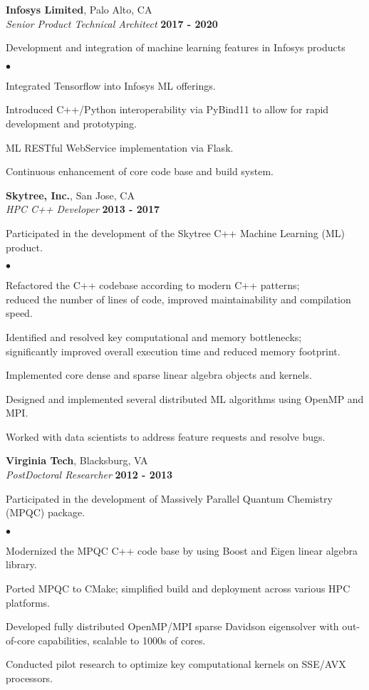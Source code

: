 \documentclass[overlap,line]{cv}
\newenvironment{list2}{
  \begin{list}{$\bullet$}{%
      \setlength{\itemsep}{0in}
      \setlength{\parsep}{0in} \setlength{\parskip}{0in}
      \setlength{\topsep}{0in} \setlength{\partopsep}{0in} 
      \setlength{\leftmargin}{0.2in}}}{\end{list}}
\begin{document}
\begin{resume}
\newpage

{\bf Infosys Limited}, Palo Alto, CA \\
{\it Senior Product Technical Architect} \hfill {\bf 2017 - 2020}

Development and integration of machine learning features in Infosys products
\vspace{.05in}
\begin{list2}
\item Integrated Tensorflow into Infosys ML offerings.
\item Introduced C++/Python interoperability via PyBind11 to allow for rapid development and prototyping.
\item ML RESTful WebService implementation via Flask.
\item Continuous enhancement of core code base and build system.
\end{list2}

{\bf Skytree, Inc.}, San Jose, CA \\
{\it HPC C++ Developer} \hfill {\bf 2013 - 2017}

Participated in the development of the Skytree C++ Machine Learning (ML) product.
\vspace{.05in}
\begin{list2}
\item Refactored the C++ codebase according to modern C++ patterns; \\
  reduced the number of lines of code, improved maintainability and compilation speed.
\item Identified and resolved key computational and memory bottlenecks; \\
  significantly improved overall execution time and reduced memory footprint.
\item Implemented core dense and sparse linear algebra objects and kernels.
\item Designed and implemented several distributed ML algorithms using OpenMP and MPI.
\item Worked with data scientists to address feature requests and resolve bugs.
\end{list2}

{\bf Virginia Tech}, Blacksburg, VA \\
{\it PostDoctoral Researcher} \hfill {\bf 2012 - 2013}

Participated in the development of Massively Parallel Quantum Chemistry (MPQC) package.
\vspace{.05in}
\begin{list2}
\item Modernized the MPQC C++ code base by using Boost and Eigen linear algebra library.
\item Ported MPQC to CMake; simplified build and deployment across various HPC platforms.
\item Developed fully distributed OpenMP/MPI sparse Davidson eigensolver
  with out-of-core capabilities, scalable to 1000s of cores.
\item Conducted pilot research to optimize key computational kernels on SSE/AVX processors.
\end{list2}



\end{resume}
\end{document}
